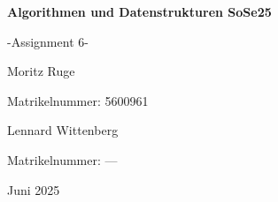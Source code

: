 \begin{titlepage}
    \centering
    \vspace*{3cm}
    {\Huge\bfseries Algorithmen und Datenstrukturen SoSe25 \par}
    \vspace{0.5cm}
    {\Huge -Assignment 6- \par}
    \vspace{1cm}
    {\Large Moritz Ruge \par}
    \vspace{0.1cm}
    {\small Matrikelnummer: 5600961 \par}
    {\Large Lennard Wittenberg \par}
    \vspace{0.1cm}
    {\small Matrikelnummer: ---\par}
    \vfill
    {\large Juni 2025}
\end{titlepage}